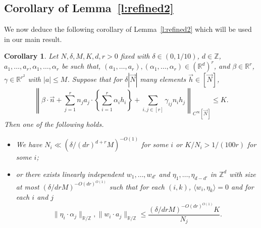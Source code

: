\documentclass[11pt, a4paper]{amsart}
\theoremstyle{plain}
\theoremstyle{plain}
\newtheorem{corollary}{Corollary}
\theoremstyle{definition}
\theoremstyle{remark}
\numberwithin{equation}{section}
\numberwithin{lemma}{section}
\numberwithin{proposition}{section}
\numberwithin{corollary}{section}
\numberwithin{definition}{section}
\numberwithin{claim}{section}
\begin{document}
\subsection{Corollary of Lemma~\ref{l:refined2}}
We now deduce the following corollary of Lemma~\ref{l:refined2} which will be used in our main result.
\begin{corollary}\label{c:bracketcorollary2}
Let $N, \delta, M, K, d, r > 0$ fixed with $\delta \in (0, 1/10)$, $d \in \mathbb{Z}$, $a_1, \dots, a_r, \alpha_1, \dots, \alpha_r$ be such that, $(a_1, \dots, a_r), (\alpha_1, \dots, \alpha_r) \in (\mathbb{R}^d)^r$, and $\beta \in \mathbb{R}^r$, $\gamma \in \mathbb{R}^{r^2}$ with $|a| \le M$. Suppose that for $\delta |\vec{N}|$ many elements $\vec{h} \in [\vec{N}]$,
$$\left\|\beta \cdot \vec{n} +  \sum_{j = 1}^r n_j a_j \cdot \left\{\sum_{i = 1}^r \alpha_i h_i\right\} + \sum_{i, j \in [r]} \gamma_{ij} n_ih_j\right\|_{C^\infty[\vec{N}]} \le K.$$
Then one of the following holds.
\begin{itemize}
    \item We have $N_i \ll (\delta/(dr)^{d + r}M)^{-O(1)}$ for some $i$ or $K/N_i > 1/(100r)$ for some $i$;
    \item or there exists linearly independent $w_1, \dots, w_{d'}$ and $\eta_1, \dots, \eta_{d - d'}$ in $\mathbb{Z}^{d}$ with size at most $(\delta/drM)^{-O(dr)^{O(1)}}$ such that for each $(i, k)$, $\langle w_i, \eta_k \rangle = 0$ and for each $i$ and $j$
    $$\|\eta_i \cdot \alpha_j\|_{\mathbb{R}/\mathbb{Z}}, \|w_i \cdot a_j\|_{\mathbb{R}/\mathbb{Z}} \le \frac{(\delta/drM)^{-O(dr)^{O(1)}}K}{N_j}.$$
\end{itemize}
\end{corollary}
\end{document}
